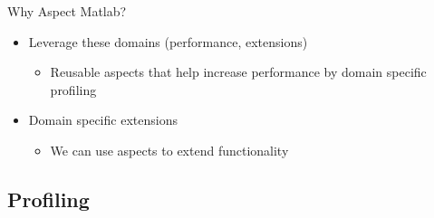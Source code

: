 \begin{frame}{Why Aspect Matlab?}
\begin{onlyenv}
\begin{itemize}
    \item Leverage these domains (performance, extensions)
      \begin{itemize}
      \item Reusable aspects that help increase performance
        by domain specific profiling
      \end{itemize}
    \item Domain specific extensions
      \begin{itemize}
      \item We can use aspects to extend functionality
      \end{itemize}
    \end{itemize}
  \end{onlyenv}
\end{frame}


\subsection*{Profiling}


